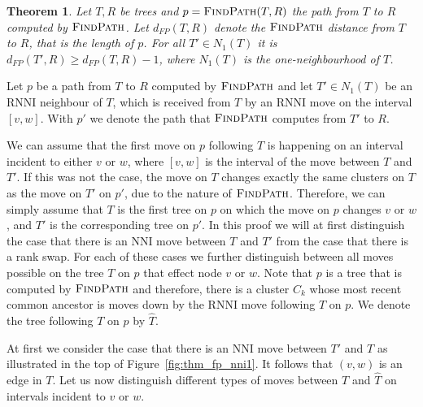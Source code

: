 \documentclass{amsart}
\newtheorem{theorem}{Theorem}
\newcommand{\rnni}{\mathrm{RNNI}}
\newcommand{\findpath}{\textsc{FindPath}}
\newcommand{\nni}{\mathrm{NNI}}
\begin{document}
\begin{theorem}
    Let $T,R$ be trees and $p = \findpath(T,R)$ the path from $T$ to $R$ computed by $\findpath$.
    Let $d_{FP}(T,R)$ denote the $\findpath$ distance from $T$ to $R$, that is the length of $p$.
    For all $T' \in N_1(T)$ it is $d_{FP}(T',R) \geq d_{FP}(T,R) - 1$, where $N_1(T)$ is the one-neighbourhood of $T$.
\end{theorem}

\proof
Let $p$ be a path from $T$ to $R$ computed by $\findpath$ and let $T' \in N_1(T)$ be an $\rnni$ neighbour of $T$, which is received from $T$ by an $\rnni$ move on the interval $[v,w]$.
With $p'$ we denote the path that $\findpath$ computes from $T'$ to $R$.

We can assume that the first move on $p$ following $T$ is happening on an interval incident to either $v$ or $w$, where $[v,w]$ is the interval of the move between $T$ and $T'$.
If this was not the case, the move on $T$ changes exactly the same clusters on $T$ as the move on $T'$ on $p'$, due to the nature of $\findpath$.
Therefore, we can simply assume that $T$ is the first tree on $p$ on which the move on $p$ changes $v$ or $w$, and $T'$ is the corresponding tree on $p'$.
In this proof we will at first distinguish the case that there is an $\nni$ move between $T$ and $T'$ from the case that there is a rank swap.
For each of these cases we further distinguish between all moves possible on the tree $T$ on $p$ that effect node $v$ or $w$.
Note that $p$ is a tree that is computed by $\findpath$ and therefore, there is a cluster $C_k$ whose most recent common ancestor is moves down by the $\rnni$ move following $T$ on $p$.
We denote the tree following $T$ on $p$ by $\hat T$.

At first we consider the case that there is an $\nni$ move between $T'$ and $T$ as illustrated in the top of Figure~\ref{fig:thm_fp_nni1}.
It follows that $(v,w)$ is an edge in $T$.
Let us now distinguish different types of moves between $T$ and $\hat T$ on intervals incident to $v$ or $w$.
\end{document}

